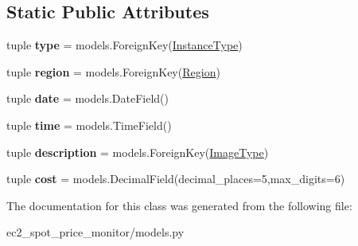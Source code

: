 \subsection*{Static Public Attributes}
\begin{DoxyCompactItemize}
\item 
\hypertarget{classec2__spot__price__monitor_1_1models_1_1SpotPrice_a6451ebeac8a6c1d0e2b7e3c3c0c79fe8}{tuple {\bfseries type} = models.\-Foreign\-Key(\hyperlink{classec2__spot__price__monitor_1_1models_1_1InstanceType}{Instance\-Type})}\label{classec2__spot__price__monitor_1_1models_1_1SpotPrice_a6451ebeac8a6c1d0e2b7e3c3c0c79fe8}

\item 
\hypertarget{classec2__spot__price__monitor_1_1models_1_1SpotPrice_ad1572241a986260a560cc650fb01457d}{tuple {\bfseries region} = models.\-Foreign\-Key(\hyperlink{classec2__spot__price__monitor_1_1models_1_1Region}{Region})}\label{classec2__spot__price__monitor_1_1models_1_1SpotPrice_ad1572241a986260a560cc650fb01457d}

\item 
\hypertarget{classec2__spot__price__monitor_1_1models_1_1SpotPrice_afb06cac4494396bc5e1831372daa2c51}{tuple {\bfseries date} = models.\-Date\-Field()}\label{classec2__spot__price__monitor_1_1models_1_1SpotPrice_afb06cac4494396bc5e1831372daa2c51}

\item 
\hypertarget{classec2__spot__price__monitor_1_1models_1_1SpotPrice_a257ae1034e7005ce76af1b65e623a9cb}{tuple {\bfseries time} = models.\-Time\-Field()}\label{classec2__spot__price__monitor_1_1models_1_1SpotPrice_a257ae1034e7005ce76af1b65e623a9cb}

\item 
\hypertarget{classec2__spot__price__monitor_1_1models_1_1SpotPrice_a565ad7d2dafa00f6fae7cba9aa93261f}{tuple {\bfseries description} = models.\-Foreign\-Key(\hyperlink{classec2__spot__price__monitor_1_1models_1_1ImageType}{Image\-Type})}\label{classec2__spot__price__monitor_1_1models_1_1SpotPrice_a565ad7d2dafa00f6fae7cba9aa93261f}

\item 
\hypertarget{classec2__spot__price__monitor_1_1models_1_1SpotPrice_a9710c268a47a615f89733e2f49579462}{tuple {\bfseries cost} = models.\-Decimal\-Field(decimal\-\_\-places=5,max\-\_\-digits=6)}\label{classec2__spot__price__monitor_1_1models_1_1SpotPrice_a9710c268a47a615f89733e2f49579462}

\end{DoxyCompactItemize}


The documentation for this class was generated from the following file\-:\begin{DoxyCompactItemize}
\item 
ec2\-\_\-spot\-\_\-price\-\_\-monitor/models.\-py\end{DoxyCompactItemize}
